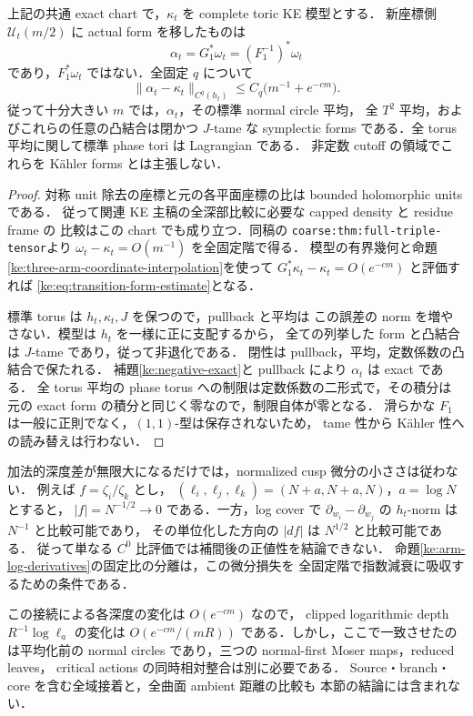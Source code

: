 \begin{corollary}
\label{ke:transition-tame-averaging}
上記の共通 exact chart で，$\kappa_t$ を complete toric KE 模型とする．
新座標側 $\mathcal U_t(m/2)$ に actual form を移したものは
\[
 \alpha_t=G_1^*\omega_t=(F_1^{-1})^*\omega_t
\]
であり，$F_1^*\omega_t$ ではない．全固定 $q$ について
\begin{equation}\label{ke:eq:transition-form-estimate}
 \|\alpha_t-\kappa_t\|_{C^q(h_t)}
 \le C_q\bigl(m^{-1}+e^{-cm}\bigr).
\end{equation}
従って十分大きい $m$ では，$\alpha_t$，その標準 normal circle 平均，
全 $T^2$ 平均，およびこれらの任意の凸結合は閉かつ $J$-tame な
symplectic forms である．全 torus 平均に関して標準 phase tori は Lagrangian である．
非定数 cutoff の領域でこれらを K\"ahler forms とは主張しない．
\end{corollary}
\begin{proof}
対称 unit 除去の座標と元の各平面座標の比は bounded holomorphic units である．
従って関連 KE 主稿の全深部比較に必要な capped density と residue frame の
比較はこの chart でも成り立つ．同稿の
\texttt{coarse:thm:full-triple-tensor}より
$\omega_t-\kappa_t=O(m^{-1})$ を全固定階で得る．
模型の有界幾何と命題\ref{ke:three-arm-coordinate-interpolation}を使って
$G_1^*\kappa_t-\kappa_t=O(e^{-cm})$ と評価すれば
\eqref{ke:eq:transition-form-estimate}となる．

標準 torus は $h_t,\kappa_t,J$ を保つので，pullback と平均は
この誤差の norm を増やさない．模型は $h_t$ を一様に正に支配するから，
全ての列挙した form と凸結合は $J$-tame であり，従って非退化である．
閉性は pullback，平均，定数係数の凸結合で保たれる．
補題\ref{ke:negative-exact}と pullback により $\alpha_t$ は exact である．
全 torus 平均の phase torus への制限は定数係数の二形式で，その積分は
元の exact form の積分と同じく零なので，制限自体が零となる．
滑らかな $F_1$ は一般に正則でなく，$(1,1)$-型は保存されないため，
tame 性から K\"ahler 性への読み替えは行わない．
\end{proof}

\begin{remark}[値の小ささと微分の小ささの区別]
\label{ke:coordinate-czero-obstruction}
加法的深度差が無限大になるだけでは，normalized cusp 微分の小ささは従わない．
例えば $f=\zeta_i/\zeta_k$ とし，
$(\ell_i,\ell_j,\ell_k)=(N+a,N+a,N)$，$a=\log N$ とすると，
$|f|=N^{-1/2}\to0$ である．一方，log cover で
$\partial_{w_i}-\partial_{w_j}$ の $h_t$-norm は $N^{-1}$ と比較可能であり，
その単位化した方向の $|df|$ は $N^{1/2}$ と比較可能である．
従って単なる $C^0$ 比評価では補間後の正値性を結論できない．
命題\ref{ke:arm-log-derivatives}の固定比の分離は，この微分損失を
全固定階で指数減衰に吸収するための条件である．
\end{remark}

この接続による各深度の変化は $O(e^{-cm})$ なので，
clipped logarithmic depth $R^{-1}\log\ell_a$ の変化は
$O(e^{-cm}/(mR))$ である．しかし，ここで一致させたのは平均化前の
normal circles であり，三つの normal-first Moser maps，reduced leaves，
critical actions の同時相対整合は別に必要である．
Source・branch・core を含む全域接着と，全曲面 ambient 距離の比較も
本節の結論には含まれない．
